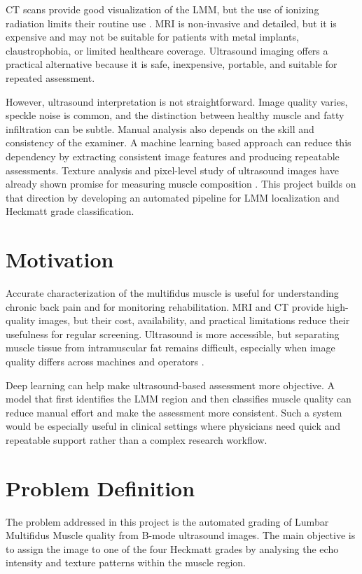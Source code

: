 ﻿\documentclass[12pt,a4paper]{report}
\begin{document}
CT scans provide good visualization of the LMM, but the use of ionizing radiation limits their routine use \cite{Brenner2022}. MRI is non-invasive and detailed, but it is expensive and may not be suitable for patients with metal implants, claustrophobia, or limited healthcare coverage. Ultrasound imaging offers a practical alternative because it is safe, inexpensive, portable, and suitable for repeated assessment.

However, ultrasound interpretation is not straightforward. Image quality varies, speckle noise is common, and the distinction between healthy muscle and fatty infiltration can be subtle. Manual analysis also depends on the skill and consistency of the examiner. A machine learning based approach can reduce this dependency by extracting consistent image features and producing repeatable assessments. Texture analysis and pixel-level study of ultrasound images have already shown promise for measuring muscle composition \cite{Pincheira2024}. This project builds on that direction by developing an automated pipeline for LMM localization and Heckmatt grade classification.


\section{Motivation}
\label{motivation}
Accurate characterization of the multifidus muscle is useful for understanding chronic back pain and for monitoring rehabilitation. MRI and CT provide high-quality images, but their cost, availability, and practical limitations reduce their usefulness for regular screening. Ultrasound is more accessible, but separating muscle tissue from intramuscular fat remains difficult, especially when image quality differs across machines and operators \cite{Sions2017}.

Deep learning can help make ultrasound-based assessment more objective. A model that first identifies the LMM region and then classifies muscle quality can reduce manual effort and make the assessment more consistent. Such a system would be especially useful in clinical settings where physicians need quick and repeatable support rather than a complex research workflow.


\section{Problem Definition}
\label{problem}
The problem addressed in this project is the automated grading of Lumbar Multifidus Muscle quality from B-mode ultrasound images. The main objective is to assign the image to one of the four Heckmatt grades by analysing the echo intensity and texture patterns within the muscle region.
\end{document}
